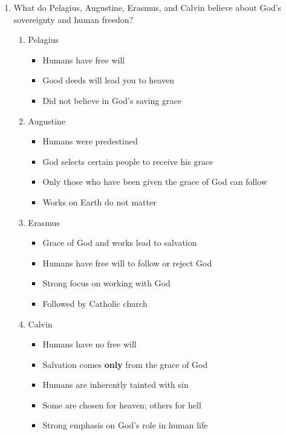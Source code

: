 \documentclass[8pt]{article}
\begin{document}
\begin{enumerate}
    \item What do Pelagius, Augustine, Erasmus, and Calvin believe about God's sovereignty and human freedon?
    \begin{enumerate}
        \item Pelagius
        \begin{itemize}
            \item Humans have free will
            \item Good deeds will lead you to heaven
            \item Did not believe in God's saving grace
        \end{itemize}
        \item Augustine
        \begin{itemize}
            \item Humans were predestined
            \item God selects certain people to receive his grace
            \item Only those who have been given the grace of God can follow
            \item Works on Earth do not matter
        \end{itemize}
        \item Erasmus
        \begin{itemize}
            \item Grace of God and works lead to salvation
            \item Humans have free will to follow or reject God
            \item Strong focus on working with God
            \item Followed by Catholic church
        \end{itemize}
        \item Calvin
        \begin{itemize}
            \item Humans have no free will
            \item Salvation comes \textbf{only} from the grace of God
            \item Humans are inherently tainted with sin
            \item Some are chosen for heaven; others for hell
            \item Strong emphasis on God's role in human life
        \end{itemize}
    \end{enumerate}


\end{enumerate}
\end{document}
